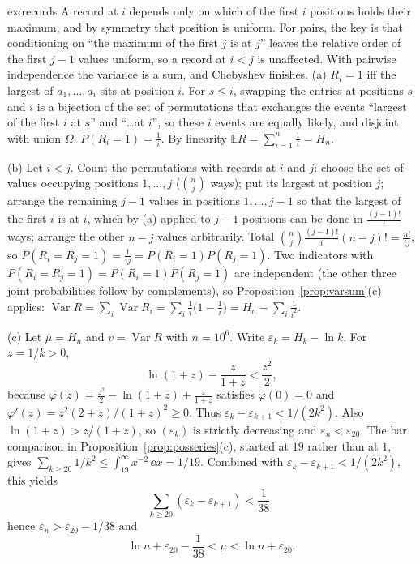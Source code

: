 \begin{solution}{ex:records}
\idea A record at $i$ depends only on which of the first $i$ positions holds their maximum, and by symmetry that position is uniform. For pairs, the key is that conditioning on ``the maximum of the first $j$ is at $j$'' leaves the relative order of the first $j-1$ values uniform, so a record at $i<j$ is unaffected. With pairwise independence the variance is a sum, and Chebyshev finishes.
\writeup (a) $R_i=1$ iff the largest of $a_1,\dots,a_i$ sits at position $i$. For $s\le i$, swapping the entries at positions $s$ and $i$ is a bijection of the set of permutations that exchanges the events ``largest of the first $i$ at $s$'' and ``\dots at $i$'', so these $i$ events are equally likely, and disjoint with union $\Omega$: $P(R_i=1)=\frac1i$. By linearity $\mathbb ER=\sum_{i=1}^n\frac1i=H_n$.

(b) Let $i<j$. Count the permutations with records at $i$ and $j$: choose the set of values occupying positions $1,\dots,j$ ($\binom nj$ ways); put its largest at position $j$; arrange the remaining $j-1$ values in positions $1,\dots,j-1$ so that the largest of the first $i$ is at $i$, which by (a) applied to $j-1$ positions can be done in $\frac{(j-1)!}i$ ways; arrange the other $n-j$ values arbitrarily. Total $\binom nj\frac{(j-1)!}i(n-j)!=\frac{n!}{ij}$, so $P(R_i=R_j=1)=\frac1{ij}=P(R_i=1)P(R_j=1)$. Two indicators with $P(R_i=R_j=1)=P(R_i=1)P(R_j=1)$ are independent (the other three joint probabilities follow by complements), so Proposition~\ref{prop:varsum}(c) applies: $\operatorname{Var}R=\sum_i\operatorname{Var}R_i=\sum_i\frac1i\big(1-\frac1i\big)=H_n-\sum_i\frac1{i^2}$.

(c) Let $\mu=H_n$ and $v=\operatorname{Var}R$ with $n=10^6$. Write $\varepsilon_k=H_k-\ln k$. For $z=1/k>0$,
\[
\ln(1+z)-\frac z{1+z}<\frac{z^2}2,
\]
because $\varphi(z)=\frac{z^2}2-\ln(1+z)+\frac z{1+z}$ satisfies $\varphi(0)=0$ and $\varphi'(z)=z^2(2+z)/(1+z)^2\ge0$. Thus $\varepsilon_k-\varepsilon_{k+1}<1/(2k^2)$. Also $\ln(1+z)>z/(1+z)$, so $(\varepsilon_k)$ is strictly decreasing and $\varepsilon_n<\varepsilon_{20}$. The bar comparison in Proposition~\ref{prop:posseries}(c), started at $19$ rather than at $1$, gives $\sum_{k\ge20}1/k^2\le\int_{19}^\infty x^{-2}\,\dd x=1/19$. Combined with $\varepsilon_k-\varepsilon_{k+1}<1/(2k^2)$, this yields
\[
\sum_{k\ge20}(\varepsilon_k-\varepsilon_{k+1})<\frac1{38},
\]
hence $\varepsilon_n>\varepsilon_{20}-1/38$ and
\[
\ln n+\varepsilon_{20}-\frac1{38}<\mu<\ln n+\varepsilon_{20}.
\]


\end{solution}
